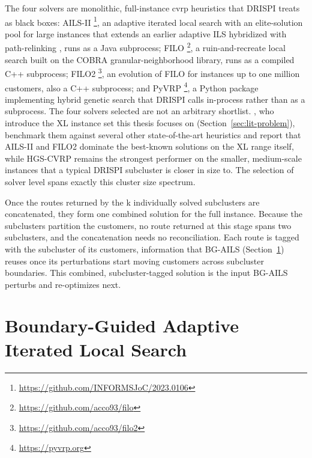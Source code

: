 The four solvers are monolithic, full-instance \gls{cvrp} heuristics that DRISPI treats as black boxes: AILS-II \citep{maximoAILSIIAdaptiveIterated2024}\footnote{\url{https://github.com/INFORMSJoC/2023.0106}}, an adaptive iterated local search with an elite-solution pool for large instances that extends an earlier adaptive ILS hybridized with path-relinking \citep{maximoHybridAdaptiveIterated2021}, runs as a Java subprocess; FILO \citep{accorsiFastScalableHeuristic2021}\footnote{\url{https://github.com/acco93/filo}}, a ruin-and-recreate local search built on the COBRA granular-neighborhood library, runs as a compiled C++ subprocess; FILO2 \citep{accorsiRoutingOneMillion2024}\footnote{\url{https://github.com/acco93/filo2}}, an evolution of FILO for instances up to one million customers, also a C++ subprocess; and PyVRP \citep{woudaPyVRPHighPerformanceVRP2024}\footnote{\url{https://pyvrp.org}}, a Python package implementing hybrid genetic search \citep{vidalHybridGeneticAlgorithm2012, vidalHybridGeneticSearchCVRP2022} that DRISPI calls in-process rather than as a subprocess. The four solvers selected are not an arbitrary shortlist. \citet{queirogaXLInstancesCapacitated2026}, who introduce the XL instance set this thesis focuses on (Section~\ref{sec:lit-problem}), benchmark them against several other state-of-the-art heuristics and report that AILS-II and FILO2 dominate the best-known solutions on the XL range itself, while HGS-CVRP remains the strongest performer on the smaller, medium-scale instances that a typical DRISPI subcluster is closer in size to. The selection of solver level spans exactly this cluster size spectrum.

Once the routes returned by the k individually solved subclusters are concatenated, they form one combined solution for the full instance. Because the subclusters partition the customers, no route returned at this stage spans two subclusters, and the concatenation needs no reconciliation. Each route is tagged with the subcluster of its customers, information that BG-AILS (Section~\ref{sec:fra-bg-ails}) reuses once its perturbations start moving customers across subcluster boundaries. This combined, subcluster-tagged solution is the input BG-AILS perturbs and re-optimizes next.

\section{Boundary-Guided Adaptive Iterated Local Search}\label{sec:fra-bg-ails}


